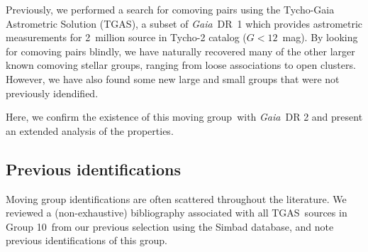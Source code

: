 \documentclass[modern,letterpaper]{aastex61}
\newcommand{\project}[1]{\textsl{#1}}
\newcommand{\acronym}[1]{{\small{#1}}}
\newcommand{\gaia}{\project{Gaia}}
\newcommand{\tgas}{\acronym{TGAS}}
\newcommand{\objname}{moving group}
\newcommand{\groupTen}{Group 10}
\begin{document}
Previously, we performed a search for comoving pairs using the Tycho-Gaia
Astrometric Solution (\tgas), a subset of \gaia\ DR~1 which provides astrometric
measurements for 2~million source in Tycho-2 catalog ($G<12$~mag).
By looking for comoving pairs blindly, we have naturally recovered
many of the other larger known comoving stellar groups, ranging from
loose associations to open clusters.
However, we have also found some new large and small groups that
were not previously idendified.

Here, we confirm the existence of this \objname\ with \gaia\ DR 2 and
present an extended analysis of the properties.











\subsection{Previous identifications}
\label{subsec:history}

Moving group identifications are often scattered throughout the literature. We
reviewed a (non-exhaustive) bibliography associated with all \tgas\ sources in
\groupTen\ from our previous selection \citep{2017AJ....153..257O} using the
Simbad database, and note previous identifications of this group.
\end{document}
